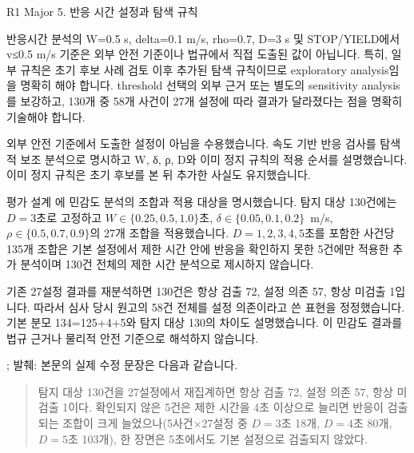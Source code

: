 \clearpage

\begin{reviewitem}{R1 Major 5. 반응 시간 설정과 탐색 규칙}

\begin{reviewercomment}

반응시간 분석의 W=0.5 s, delta=0.1 m/s, rho=0.7, D=3 s 및 STOP/YIELD에서 v≤0.5 m/s 기준은 외부 안전 기준이나 법규에서 직접 도출된 값이 아닙니다. 특히, 일부 규칙은 초기 후보 사례 검토 이후 추가된 탐색 규칙이므로 exploratory analysis임을 명확히 해야 합니다. threshold 선택의 외부 근거 또는 별도의 sensitivity analysis를 보강하고, 130개 중 58개 사건이 27개 설정에 따라 결과가 달라졌다는 점을 명확히 기술해야 합니다.

\end{reviewercomment}

\begin{authorresponse}

외부 안전 기준에서 도출한 설정이 아님을 수용했습니다. 속도 기반 반응 검사를 탐색적 보조 분석으로 명시하고 W, δ, ρ, D와 이미 정지 규칙의 적용 순서를 설명했습니다. 이미 정지 규칙은 초기 후보를 본 뒤 추가한 사실도 유지했습니다.

평가 설계 에 민감도 분석의 조합과 적용 대상을 명시했습니다. 탐지 대상 130건에는 $D=3$초로 고정하고 $W\in\{0.25,0.5,1.0\}$초, $\delta\in\{0.05,0.1,0.2\}$~m/s, $\rho\in\{0.5,0.7,0.9\}$의 27개 조합을 적용했습니다. $D=1,2,3,4,5$초를 포함한 사건당 135개 조합은 기본 설정에서 제한 시간 안에 반응을 확인하지 못한 5건에만 적용한 추가 분석이며 130건 전체의 제한 시간 분석으로 제시하지 않습니다.

기존 27설정 결과를 재분석하면 130건은 항상 검출 72, 설정 의존 57, 항상 미검출 1입니다. 따라서 심사 당시 원고의 58건 전체를 설정 의존이라고 쓴 표현을 정정했습니다. 기본 분모 134=125+4+5와 탐지 대상 130의 차이도 설명했습니다. 이 민감도 결과를 법규 근거나 물리적 안전 기준으로 해석하지 않습니다.

\end{authorresponse}

\begin{manuscriptrevision}{; 발췌: }
본문의 실제 수정 문장은 다음과 같습니다.

\begin{quote}
탐지 대상 130건을 27설정에서 재집계하면 항상 검출 72, 설정 의존 57, 항상 미검출 1이다. 확인되지 않은 5건은 제한 시간을 4초 이상으로 늘리면 반응이 검출되는 조합이 크게 늘었으나(5사건$\times$27설정 중 $D=3$초 18개, $D=4$초 80개, $D=5$초 103개), 한 장면은 5초에서도 기본 설정으로 검출되지 않았다.
\end{quote}
\end{manuscriptrevision}

\end{reviewitem}

